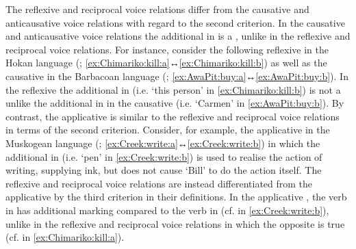 The reflexive and reciprocal voice relations differ from the causative and anticausative voice relations with regard to the second criterion. In the causative and anticausative voice relations the additional  in  is a , unlike in the reflexive and reciprocal voice relations. For instance, consider the following reflexive  in the Hokan language  (; \ref{ex:Chimariko:kill:a}↔\ref{ex:Chimariko:kill:b}) as well as the causative  in the Barbacoan language  (; \ref{ex:AwaPit:buy:a}↔\ref{ex:AwaPit:buy:b}). In the  reflexive  the additional  in  (i.e. ‘this person’ in \ref{ex:Chimariko:kill:b}) is not a  unlike the additional  in  in the  causative  (i.e. ‘Carmen’ in \ref{ex:AwaPit:buy:b}).  By contrast, the applicative  is similar to the reflexive and reciprocal voice relations in terms of the second criterion. Consider, for example, the applicative  in the Muskogean language  (; \ref{ex:Creek:write:a}↔\ref{ex:Creek:write:b}) in which the additional  in  (i.e. ‘pen’ in \ref{ex:Creek:write:b}) is used to realise the action of writing, supplying ink, but does not cause ‘Bill’ to do the action itself. The reflexive and reciprocal voice relations are instead differentiated from the applicative  by the third criterion in their definitions. In the applicative , the verb in  has additional marking compared to the verb in  (cf.   in \ref{ex:Creek:write:b}), unlike in the reflexive and reciprocal voice relations in which the opposite is true (cf.   in \ref{ex:Chimariko:kill:a}). 

